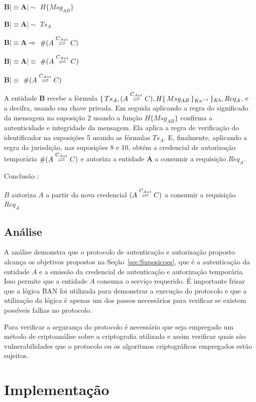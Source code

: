 $\textbf{B}\mid\equiv \textbf{A} \mid\sim $  $H\{Msg_{AB}\}$

$\textbf{B}\mid\equiv \textbf{A} \mid\sim$ ${Ts_A}$

$\textbf{B}\mid\equiv \textbf{A} \Rightarrow $  ${\#({A}\stackrel{{C_{Aut}}}{\rightleftharpoons}{C})}$

$\textbf{B}\mid\equiv \textbf{A} \mid\equiv $  ${\#({A}\stackrel{{C_{Aut}}}{\rightleftharpoons}{C})}$

$\textbf{B}\mid\equiv$ ${\#({A}\stackrel{{C_{Aut}}}{\rightleftharpoons}{C})}$

A entidade ${\textbf{B}}$ recebe a fórmula ${\{\,{Ts_A,({A}\stackrel{{C_{Aut}}}{\rightleftharpoons}{C}),H{\{\,{Msg_{AB}}\,\}_{Ka ^{-1}}}}\,\}_{Kb}},{Req_A}$, e a decifra, usando sua chave privada. Em seguida aplicando a regra do significado da mensagem na suposição 2 usando a função $H\{Msg_{AB}\}$ confirma a autenticidade e integridade da mensagem. Ela aplica a regra de verificação do identificador na suposições 5 usando as fórmulas ${Ts_A}$. E, finalmente, aplicando a regra da jurisdição, nas suposições 8 e 10, obtém a credencial de autorização temporária ${\#({A}\stackrel{{C_{Aut}}}{\rightleftharpoons}{C})}$ e autoriza a entidade \textbf{A} a consumir a requisição ${Req_A}$.

Conclusão :

${B}$ autoriza ${A}$ a partir da nova credencial ${({A}\stackrel{{C_{Aut}}}{\rightleftharpoons}{C})}$ a consumir a requisição ${Req_A}$

\subsection{Análise}

A análise demonstra que o protocolo de autenticação e autorização proposto alcança os objetivos propostos na Seção~\ref{sec:Suposicoes}, que é a autenticação da entidade ${A}$ e a emissão da credencial de autenticação e autorização temporária. Isso permite que a entidade ${A}$ consuma o serviço requerido. É importante frisar que a lógica BAN foi utilizada para demonstrar a execução do protocolo e que a utilização da lógica é apenas um dos passos necessários para verificar se existem possíveis falhas no protocolo.

Para verificar a segurança do protocolo é necessário que seja empregado um método de criptoanálise sobre a criptografia utilizada e assim verificar quais são vulnerabilidades que o protocolo ou os algoritmos criptográficos empregados estão sujeitos.


\section{Implementação}\label{sec:implementacao}

